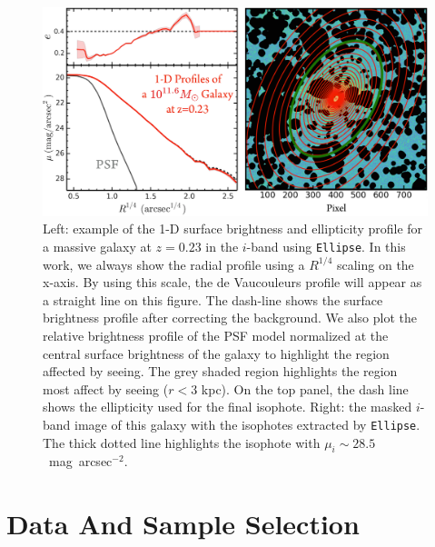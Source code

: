 \documentclass[a4paper,fleqn,usenatbib]{mnras}
\def\sb{mag~arcsec$^{-2}$}
\begin{document}
    \begin{figure}
        \centering 
        \includegraphics[width=\textwidth]{fig/redbcg_ellipse_example}
        \caption{
            Left: example of the 1-D surface brightness and ellipticity profile 
            for a massive galaxy at $z=0.23$ in the $i$-band using \texttt{Ellipse}. 
            In this work, we always show the radial profile using a $R^{1/4}$ scaling 
            on the x-axis. 
            By using this scale, the de Vaucouleurs profile will appear as a straight 
            line on this figure. 
            The dash-line shows the surface brightness profile after correcting the 
            background. 
            We also plot the relative brightness profile of the PSF model normalized 
            at the central surface brightness of the galaxy to highlight the region 
            affected by seeing. 
            The grey shaded region highlights the region most affect by seeing 
            ($r<3$ kpc).
            On the top panel, the dash line shows the ellipticity used for the final 
            isophote. 
            Right: the masked $i$-band image of this galaxy with the isophotes 
            extracted by \texttt{Ellipse}. 
            The thick dotted line highlights the isophote with 
            $\mu_{i}\sim 28.5$~\sb.
            }
        \label{fig:ellipse}
    \end{figure}

\section{Data And Sample Selection}
    \label{sec:data}
\end{document}
